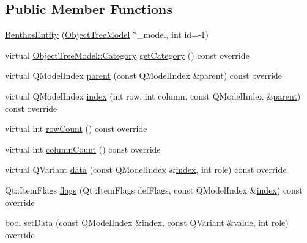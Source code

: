 \subsection*{Public Member Functions}
\begin{DoxyCompactItemize}
\item 
\mbox{\hyperlink{classobjecttree_1_1_benthos_entity_aa4d443076fea7fe9a028bb90c8dfa49a}{Benthos\+Entity}} (\mbox{\hyperlink{class_object_tree_model}{Object\+Tree\+Model}} $\ast$\+\_\+model, int id=-\/1)
\item 
virtual \mbox{\hyperlink{class_object_tree_model_a379e9d6b0d381853785adf62095ba4e3}{Object\+Tree\+Model\+::\+Category}} \mbox{\hyperlink{classobjecttree_1_1_benthos_entity_ab067e241be1ead62dbd759859567dc21}{get\+Category}} () const override
\item 
virtual Q\+Model\+Index \mbox{\hyperlink{classobjecttree_1_1_benthos_entity_af18ea8bf0bb5188e380155fa22ce06b8}{parent}} (const Q\+Model\+Index \&parent) const override
\item 
virtual Q\+Model\+Index \mbox{\hyperlink{classobjecttree_1_1_benthos_entity_aa6fee60ab1e162af5925f7662a5e51fd}{index}} (int row, int column, const Q\+Model\+Index \&\mbox{\hyperlink{classobjecttree_1_1_benthos_entity_af18ea8bf0bb5188e380155fa22ce06b8}{parent}}) const override
\item 
virtual int \mbox{\hyperlink{classobjecttree_1_1_benthos_entity_af67e02020b32cea699a5177d9e574e4d}{row\+Count}} () const override
\item 
virtual int \mbox{\hyperlink{classobjecttree_1_1_benthos_entity_a2761ad58185c249be3c9419a0373cbe5}{column\+Count}} () const override
\item 
virtual Q\+Variant \mbox{\hyperlink{classobjecttree_1_1_benthos_entity_a4dde2d711ad2c07d6971f3a222e07ff3}{data}} (const Q\+Model\+Index \&\mbox{\hyperlink{classobjecttree_1_1_benthos_entity_aa6fee60ab1e162af5925f7662a5e51fd}{index}}, int role) const override
\item 
Qt\+::\+Item\+Flags \mbox{\hyperlink{classobjecttree_1_1_benthos_entity_a57ec678c2e68372b9d678e6f6b5546eb}{flags}} (Qt\+::\+Item\+Flags def\+Flags, const Q\+Model\+Index \&\mbox{\hyperlink{classobjecttree_1_1_benthos_entity_aa6fee60ab1e162af5925f7662a5e51fd}{index}}) const override
\item 
bool \mbox{\hyperlink{classobjecttree_1_1_benthos_entity_abbee8f3f8768e62153824707a81a96ff}{set\+Data}} (const Q\+Model\+Index \&\mbox{\hyperlink{classobjecttree_1_1_benthos_entity_aa6fee60ab1e162af5925f7662a5e51fd}{index}}, const Q\+Variant \&\mbox{\hyperlink{diffusion_8cpp_a4b41795815d9f3d03abfc739e666d5da}{value}}, int role) override
\end{DoxyCompactItemize}
